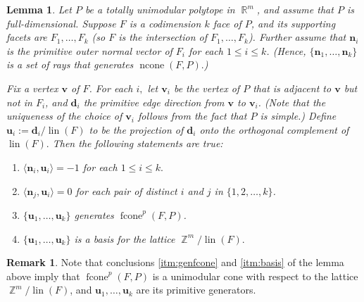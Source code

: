 \documentclass[12pt]{amsart}
\numberwithin{equation}{section}
\newtheorem{lem}[thm]{Lemma}
\theoremstyle{definition}
\newtheorem{rmk}[thm]{Remark}
\def\fcone{\operatorname{fcone}}
\def\ncone{\operatorname{ncone}}
\def\lin{\operatorname{lin}}
\def\bv{{\boldsymbol{v}}}
\def\bd{\boldsymbol{d}}
\def\bn{\boldsymbol{n}}
\def\bu{\boldsymbol{u}}
\def\Z{\operatorname{\mathbb{Z}}}
\def\R{\operatorname{\mathbb{R}}}
\begin{document}
\begin{lem}\label{innerprod} Let $P$ be a totally unimodular polytope in $\R^{m}$, and assume that $P$ is full-dimensional. Suppose $F$ is a codimension $k$ face of $P$, and its supporting facets are $F_{1},\dots,F_{k}$ (so $F$ is the intersection of $F_{1},\dots,F_{k}$). Further assume that $\bn_i$ is the primitive outer normal vector of $F_{i}$ for each $1 \le i \le k$. (Hence, $\{\bn_1, \dots, \bn_k\}$ is a set of rays that generates $\ncone(F,P).$) 
	
	Fix a vertex $\bv$ of $F$. For each $i,$ let $\bv_{i}$ be the vertex of $P$ that is adjacent to $\bv$ but not in $F_{i}$, and $\bd_{i}$ the primitive edge direction from $\bv$ to $\bv_{i}$. (Note that the uniqueness of the choice of $\bv_i$ follows from the fact that $P$ is simple.) Define $\bu_{i}:=\bd_{i}/\lin(F)$ to be the projection of $\bd_i$ onto the orthogonal complement of $\lin(F).$ Then the following statements are true:
\begin{enumerate}[label={\rm (\arabic*)}]
   
    \item $\langle \bn_{i}, \bu_{i} \rangle = -1$ for each $1 \le i \le k.$
    \item $\langle \bn_{j}, \bu_{i} \rangle = 0$ for each pair of distinct $i$ and $j$ in $\{1, 2, \dots, k\}$.
    \item\label{itm:genfcone} $\{\bu_{1},\dots,\bu_{k}\}$ generates $\fcone^{p}(F,P)$.
    \item\label{itm:basis} $\{\bu_{1},\dots,\bu_{k}\}$ is a basis for the lattice $\Z^m/\lin(F).$
\end{enumerate}
\end{lem}

\begin{rmk}\label{rmk:innerprod}
  Note that conclusions \ref{itm:genfcone} and \ref{itm:basis} of the lemma above imply that $\fcone^p(F,P)$ is a unimodular cone with respect to the lattice $\Z^m/\lin(F)$, and $\bu_1, \dots, \bu_k$ are its primitive generators. 
\end{rmk}
\end{document}
